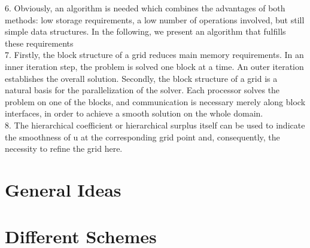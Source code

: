 6. Obviously, an algorithm is needed which combines the advantages of both methods: low storage requirements, a low number of operations involved, but still simple data structures. In the following, we present an algorithm that fulfills these requirements\cite{Griebel1995} \\

7. Firstly, the block structure of a grid reduces main memory requirements. In an inner iteration step, the problem is solved one block at a time. An outer iteration establishes the overall solution. Secondly, the block structure of a grid is a natural basis for the parallelization of the solver. Each processor solves the problem on one of the blocks, and communication is necessary merely along block interfaces, in order to achieve a smooth solution on the whole domain.\cite{Griebel1995} \\

8. The hierarchical coefficient or hierarchical surplus itself can be used to indicate the smoothness of u at the corresponding grid point and, consequently, the necessity to refine the grid here.\cite{Bungartz1998}\\
 
 \section{General Ideas}
 
 \section{Different Schemes}
 


